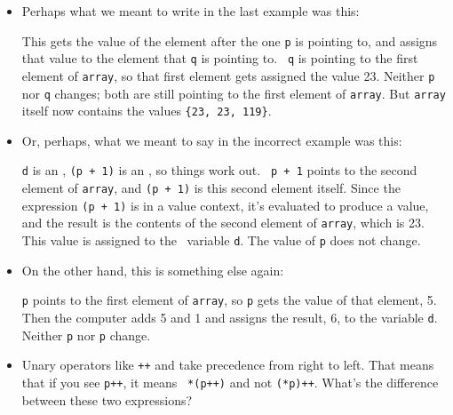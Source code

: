\begin{itemize}
\item Perhaps what we meant to write in the last example was this:

\begin{flushleft}
\verb% *q = *(p + 1);% \\*
\end{flushleft}

This gets the value of the element after the one {\tt p} is pointing to,
and assigns that value to the element that {\tt q} is pointing to.  {\tt
q} is pointing to the first element of {\tt array}, so that first element
gets assigned the value 23. Neither {\tt p} nor {\tt q} changes; both
are still pointing to the first element of {\tt array}.  But {\tt array}
itself now contains the values {\tt \{23, 23, 119\}}.  

\item Or, perhaps, what we meant to say in the incorrect example was
this: 

\begin{flushleft}
\verb% d = *(p + 1);%
\end{flushleft}

{\tt d} is an \int, \mbox{\tt *(p + 1)} is an \int, so things work out.  \mbox{\tt
p + 1} points to the second element of {\tt array}, and \mbox{\tt *(p + 1)} is
this second element itself.  Since the expression \mbox{\tt *(p + 1)} is in a
value context, it's evaluated to produce a value, and the result is the
contents of the second element of {\tt array}, which is 23.  This value is
assigned to the \int\ variable {\tt d}.  The value of {\tt p} does not
change. 

\item On the other hand, this is something else again:

\begin{flushleft}
\verb% d = *p + 1;%
\end{flushleft}

{\tt p} points to the first element of {\tt array}, so {\tt *p} gets the
value of that element, 5.  Then the computer adds 5 and 1 and assigns
the result, 6, to the variable {\tt d}.  Neither {\tt p} nor {\tt *p}
change.  

\item Unary operators like {\tt ++} and {\tt *} take precedence from
right to left.  That means that if you see {\tt *p++}, it means {\tt
*(p++)} and not {\tt (*p)++}.  What's the difference between these two
expressions?

\begin{flushleft}
\verb% d = *(p++);% 
\end{flushleft}


\end{itemize}
